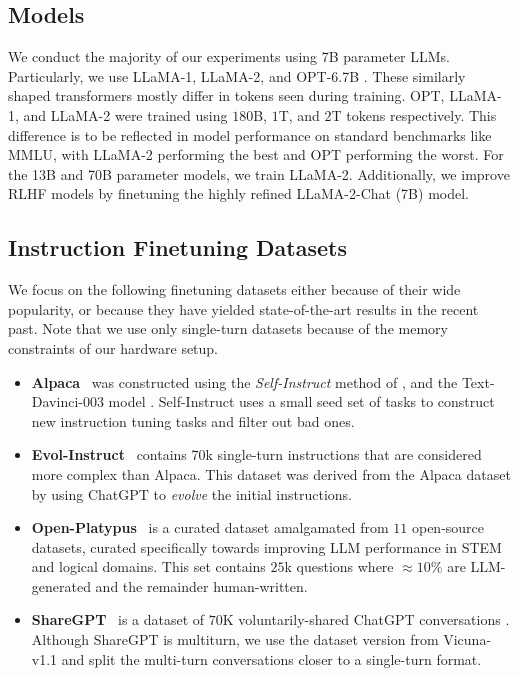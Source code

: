 \documentclass{article} %
\newcommand{\llama}{LLaMA}
\begin{document}
\subsection{Models}\label{sec:model_exp_setup}
We conduct the majority of our experiments using 7B parameter LLMs. Particularly, we use \llama{}-1, \llama{}-2, and OPT-6.7B \citep{touvron2023llama, touvron2023llama2, zhang2022opt}. These similarly shaped transformers mostly differ in tokens seen during training. OPT, \llama{}-1, and \llama{}-2 were trained using $180$B, $1$T, and $2$T tokens respectively. This difference is to be reflected in model performance on standard benchmarks like MMLU, with \llama{}-2 performing the best and OPT performing the worst. For the 13B and 70B parameter models, we train \llama{}-2. Additionally, we improve RLHF models by finetuning the highly refined \llama{}-2-Chat (7B) model. 

\subsection{Instruction Finetuning Datasets}\label{sec:Datasets}

We focus on the following finetuning datasets either because of their wide popularity, or because they have yielded state-of-the-art results in the recent past.
Note that we use only single-turn datasets because of the memory constraints of our hardware setup.
\begin{itemize}[itemsep=0cm,leftmargin=0.4cm]
    \vspace{-0.2cm}
    \item\textbf{Alpaca}~\citep{alpaca} was constructed using the {\em Self-Instruct} method of \citet{wang2022selfinstruct}, and the Text-Davinci-003 model \citep{InstructGPT}. Self-Instruct uses a small seed set of tasks to construct new instruction tuning tasks and filter out bad ones.
    \item\textbf{Evol-Instruct}~\citep{xu2023wizardlm} contains 70k single-turn instructions that are considered more complex than Alpaca. This dataset was derived from the Alpaca dataset by using ChatGPT to {\em evolve} the initial instructions.
    \item\textbf{Open-Platypus}~\citep{platypus2023} is a curated dataset amalgamated from $11$ open-source datasets, curated specifically towards improving LLM performance in STEM and logical domains. This set contains $25$k questions where $\approx 10\%$ are LLM-generated and the remainder human-written.
    \item\textbf{ShareGPT}~\citep{vicuna2023} is a dataset of $70$K voluntarily-shared ChatGPT conversations \citep{sharegpt}. Although ShareGPT is multiturn, we use the dataset version from Vicuna-v1.1 and split the multi-turn conversations closer to a single-turn format.
\end{itemize}
\end{document}
